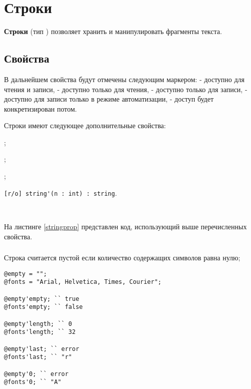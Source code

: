 \section{Строки}

{\bf Строки} (тип \str{}) позволяет хранить и манипулировать фрагменты текста. 

\subsection{Свойства}

В дальнейшем свойства будут отмечены следующим маркером: \code{[r/w]} - доступно для чтения и записи, \code{[r/o]} - доступно только для чтения, \code{[w/o]} - доступно только для записи,  \code{[r/*]} - доступно для записи только в режиме автоматизации, \code{[*/*]} - доступ будет конкретизирован потом.

Строки имеют следующее дополнительные свойства:
\begin{icItems}
\item
	;
\item
	;
\item
	;
\item
    \lstinline|[r/o] string'(n : int) : string|.
\end{icItems}

\

На листинге \ref{stringprop} представлен код, использующий выше перечисленных свойства.

\subsubsection{}

Строка считается пустой если количество содержащих символов равна нулю;

\begin{lstlisting}[caption=Свойства класса string, label=stringprop]
@empty = "";
@fonts = "Arial, Helvetica, Times, Courier";

@empty'empty; `` true
@fonts'empty; `` false

@empty'length; `` 0
@fonts'length; `` 32

@empty'last; `` error
@fonts'last; `` "r"

@empty'0; `` error
@fonts'0; `` "A"
\end{lstlisting}

\subsubsection{}

